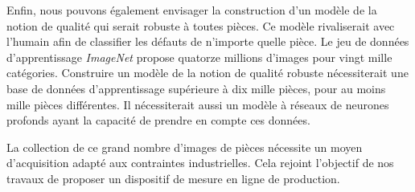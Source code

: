 Enfin, nous pouvons également envisager la construction d’un modèle de la notion de qualité qui serait robuste à toutes pièces.
Ce modèle rivaliserait avec l’humain afin de classifier les défauts de n’importe quelle pièce.
Le jeu de données d'apprentissage \textit{ImageNet} propose quatorze millions d’images pour vingt mille catégories.
Construire un modèle de la notion de qualité robuste nécessiterait une base de données d’apprentissage supérieure à dix mille pièces, pour au moins mille pièces différentes.
Il nécessiterait aussi un modèle à réseaux de neurones profonds ayant la capacité de prendre en compte ces données.

La collection de ce grand nombre d'images de pièces nécessite un moyen d'acquisition adapté aux contraintes industrielles.
Cela rejoint l'objectif de nos travaux de proposer un dispositif de mesure en ligne de production.

